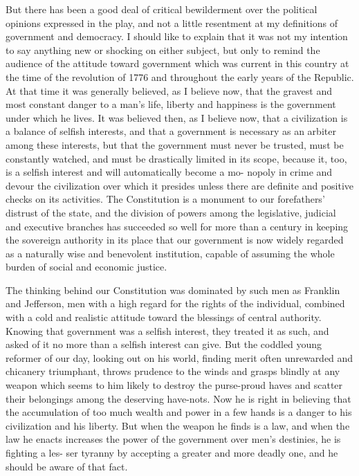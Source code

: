 \documentclass[9pt,twoside]{extarticle}
\begin{document}
But there has been a good deal of critical bewilderment over the political opinions expressed in the play, and not a little resentment at my definitions of government and democracy. I should like to explain that it was not my intention to say anything new or shocking on either subject, but only to remind the audience of the attitude toward government which was current in this country at the time of the revolution of 1776 and throughout the early years of the Republic. At that time it was generally believed, as I believe now, that the gravest and most constant danger to a man's life, liberty and happiness is the government under which he lives. It was believed then, as I believe now, that a civilization is a balance of selfish interests, and that a government is necessary as an arbiter among these interests, but that the government must never be trusted, must be constantly watched, and must be drastically limited in its scope, because it, too, is a selfish interest and will automatically become a mo- nopoly in crime and devour the civilization over which it presides unless there are definite and positive checks on its activities. The Constitution is a monument to our forefathers' distrust of the state, and the division of powers among the legislative, judicial and executive branches has succeeded so well for more than a century in keeping the sovereign authority in its place that our government is now widely regarded as a naturally wise and benevolent institution, capable of assuming the whole burden of social and economic justice.

The thinking behind our Constitution was dominated by such men as Franklin and Jefferson, men with a high regard for the rights of the individual, combined with a cold and realistic attitude toward the blessings of central authority. Knowing that government was a selfish interest, they treated it as such, and asked of it no more than a selfish interest can give. But the coddled young reformer of our day, looking out on his world, finding merit often unrewarded and chicanery triumphant, throws prudence to the winds and grasps blindly at any weapon which seems to him likely to destroy the purse-proud haves and scatter their belongings among the deserving have-nots. Now he is right in believing that the accumulation of too much wealth and power in a few hands is a danger to his civilization and his liberty. But when the weapon he finds is a law, and when the law he enacts increases the power of the government over men's destinies, he is fighting a les- ser tyranny by accepting a greater and more deadly one, and he should be aware of that fact.
\end{document}
